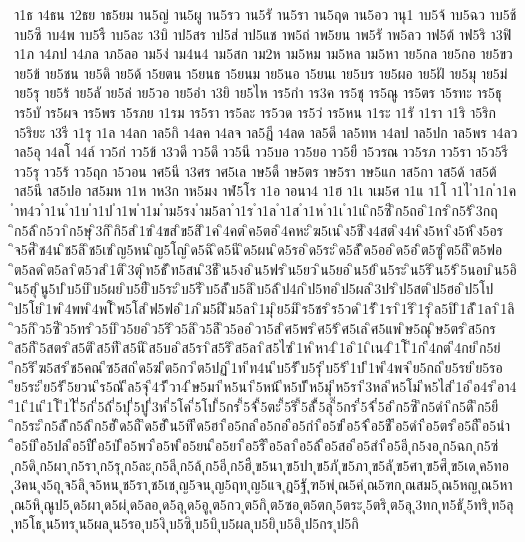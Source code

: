 {า1ธ
า4ธน
า2ธย
าธ5ยม
าน5ญ่
าน5ผู
าน5รว
าน5รั
าน5รา
าน5ฤด
าน5อว
านุ1
าบ5จ้
าบ5ฉว
าบ5ช้
าบ5ซึ
าบ4พ
าบ5รื
าบ5ละ
า3บิ
าป5สร
าป5ส่
าป5แช
าพ5ถ่
าพ5ยน
าพ5รั
าพ5ลว
าฟ5ต้
าฟ5ริ
า3ฟิ
า1ภ
า4ภป
า4ภล
าภ5ลอ
าม5ง่
าม4น4
าม5สก
าม2ห
าม5หม
าม5หล
าม5หา
าย5กล
าย5กอ
าย5ขว
าย5ข้
าย5ชน
าย5ดิ
าย5ด้
า5ยตน
า5ยนธ
า5ยนม
าย5นอ
า5ยนเ
าย5บร
าย5ผอ
าย5ฝั
าย5มุ
าย5ม่
าย5รุ
าย5ร้
าย5ลั
าย5ล่
าย5วอ
าย5อำ
า3ยิ
าย5ไห
าร5กำ
าร3ค
าร5ชุ
าร5ณู
าร5ตร
า5รทะ
าร5ธุ
าร5บั
าร5ผจ
าร5พร
า5รภย
า1รม
าร5รา
าร5ละ
าร5วด
าร5ว่
าร5หน
า1ระ
า1รั
า1รา
า1ริ
า5ริก
า5ริยะ
า3รี
า1รุ
า1ล
า4ลก
าล5กิ
า4ลค
า4ลจ
าล5ฎี
า4ลด
าล5ดี
าล5ทห
า4ลป
าล5ปก
าล5พร
า4ลว
าล5อุ
า4ลโ
า4ล์
าว5ก่
าว5ข้
า3วดี
าว5ดึ
าว5นี
าว5บอ
าว5ยอ
าว5ยื
า5วรณ
าว5รภ
าว5รา
า5ว5รี
าว5รุ
าว5ร้
าว5ฤก
า5วอน
าศ5นี
า3ศร
าศ5เล
าษ5ดื
าษ5ตร
าษ5รา
าษ5แก
าส5กา
าส5ด้
าส5ต้
าส5นี
าส5ปอ
าส5มห
า1ห
าห3ก
าห5มง
าฬ5โร
า1อ
าอนา4
า1ฮ
า1เ
าเม5ศ
า1แ
า1โ
า1ไ
ำ1ก
ำ1ค
ำท4ว
ำ1น
ำ1บ
ำ1ป
ำ1พ
ำ1ม
ำม5รง
ำม5ลา
ำ1ร
ำ1ล
ำ1ส
ำ1ห
ำ1เ
ำ1แ
ิก5ซี
ิก5ถอ
ิ1กร
ิก5ร้
ิ3กฤ
ิก5ล้
ิก5วา
ิก5ษุ
ิ3กิ
ิกิ5ส
ิ1ข
ิ4ขส
ิข5สิ
ิ1ค
ิ4คต
ิค5ตอ
ิ4คหะ
ิฆ5เน
ิง5ชี
ิง4สต
ิง4ห
ิง5หา
ิง5ห้
ิง5อร
ิจ5ศี
ิช4น
ิช5ลิ
ิช5เช
ิญ5หน
ิญ5โญ
ิด5ฉิ
ิด5นี
ิด5ผน
ิด5รอ
ิด5ระ
ิด5ลั
ิด5ออ
ิด5อ่
ิต5ซู
ิต5ถี
ิต5ฟอ
ิต5ลด
ิต5ลา
ิต5วส
ิ1ติ
ิ3ตุ
ิท5ธั
ิท5สน
ิ3ธี
ิน5งอ
ิน5ฟร
ิน5ยว
ิน5ยอ
ิน5ย้
ิน5ระ
ิน5ริ
ิน5ร้
ิ5นอบ
ิน5อิ
ิน5ฮุ
ินู5ป
ิบ5บิ
ิบ5ผย
ิบ5ยื
ิบ5ระ
ิบ5รี
ิบ5ลั
ิบ5ลิ
ิบ5ล้
ิป4ก
ิป5ทอ
ิป5ผล
ิ3ปร
ิป5สต
ิป5ฮอ
ิป5โป
ิป5โย
ิ1พ
ิ4พพ
ิ4พโ
ิพ5โส
ิฟ5ฟอ
ิ1ภ
ิม5ฝี
ิม5ลา
ิ1มุ
ิย5มิ
ิร5ชร
ิร5วด
ิ1รั
ิ1รา
ิ1ริ
ิ1รุ
ิล5ปิ
ิ1ลั
ิ1ลา
ิ1ลิ
ิว5กิ
ิว5ซี
ิว5ทร
ิว5บิ
ิว5ยอ
ิว5ริ
ิว5ลิ
ิว5ลึ
ิว5ออ
ิวา5ส
ิศ5พร
ิศ5ร้
ิศ5เล
ิศ5แพ
ิษ5ณุ
ิษ5ตร
ิส5กร
ิส5กี
ิ5สตร
ิส5ติ
ิส5ที
ิส5นี
ิส5บอ
ิส5รา
ิส5ริ
ิส5ลา
ิส5ไซ
ิ1ห
ิหา4
ิ1อ
ิ1เ
ิเน4
ิ1โ
ี1ก
ี4กต
ี4กย
ีก5ย่
ีก5ริ
ีฆ5สร
ีช5คณ
ีซ5สถ
ีด5ฆ่
ีต5กว
ีต5ปฏ
ี1ท
ีท4น
ีบ5รั
ีบ5รุ
ีบ5ร้
ี1ป
ี1พ
ี4พจ
ีย5กถ
ีย5รย
ีย5รอ
ีย5ระ
ีย5รั
ี5ยวน
ีร5ณั
ีล5จุ
ี4วั
ีวา4
ีษ5มา
ีห5นา
ี5หน้
ีห5บั
ีห5มุ
ีห5รา
ี3หล
ีห5โม
ีห5ไส
ี1อ
ีอ4ร
ีอา4
ี1เ
ี1แ
ี1โ
ี1ไ
ี่5ก่
ี่5ถ้
ี่5ปุ
ี่5ปู
ี่3ห
ี่5โค
ี่5โป
ี้5กร
ี้5จ้
ี้5ตะ
ี้5ริ
ี้5ลั
ี้5ลุ
ี๊5กร
ี๋5จ้
ี๋5อ๋
ึก5ซึ
ึก5ดำ
ึก5ดื
ึก5ยื
ึก5ระ
ึก5ลั
ึก5ล้
ึก5ฮั
ึด5ถื
ึด5ฮั
ึน5ทึ
ืด5ฮา
ือ5กล
ือ5กอ
ือ5กำ
ือ5ข่
ือ5จ้
ือ5ชื
ือ5ดำ
ือ5ตร
ือ5ถื
ือ5นำ
ือ5บิ
ือ5ปล
ือ5ปื
ือ5ป่
ือ5พว
ือ5พ่
ือ5ยน
ือ5ยา
ือ5รื
ือ5ลา
ือ5ล้
ือ5สอ
ือ5สำ
ือ5อี
ุก5งอ
ุก5ฉก
ุก5ซ่
ุก5ดิ
ุก5ผา
ุก5รา
ุก5รุ
ุก5ละ
ุก5ลี
ุก5ล้
ุก5อี
ุก5ฮื
ุข5นา
ุข5ปา
ุข5ภั
ุข5ภา
ุข5ลั
ุข5ศา
ุข5ศึ
ุข5เด
ุค5ทอ
ุ3คน
ุง5ถุ
ุจ5ลิ
ุจ5หน
ุช5รา
ุช5เช
ุญ5จน
ุญ5ฤท
ุญ5แจ
ุฎ5ฐั
ุฑ5พ่
ุณ5ค่
ุณ5ฑก
ุณสม5
ุณ5หญ
ุณ5หา
ุณ5หิ
ุณูป5
ุด5ผา
ุด5ผ่
ุด5ลอ
ุด5ลุ
ุด5อู
ุต5กว
ุต5กิ
ุต5ซอ
ุต5ตก
ุ5ตระ
ุ5ตริ
ุต5ลุ
ุ3ทก
ุท5ธั
ุ5ทริ
ุท5ลุ
ุท5โธ
ุน5ทร
ุน5ผล
ุน5รอ
ุบ5งิ
ุบ5ซิ
ุบ5บิ
ุบ5ผล
ุบ5ยิ
ุบ5อิ
ุป5กร
ุป5กิ
}

